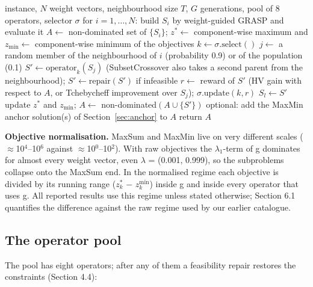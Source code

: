 \begin{algorithm}[t]
\caption{MOEA/D with a pool of operators and a selector}
\label{alg:moead}
\begin{algorithmic}
\REQUIRE instance, $N$ weight vectors, neighbourhood size $T$, $G$ generations, pool of 8 operators, selector $\sigma$
\STATE for $i=1,\dots,N$: build $S_i$ by weight-guided GRASP and evaluate it
\STATE $A \leftarrow$ non-dominated set of $\{S_i\}$; $z^{*}\leftarrow$ component-wise maximum and $z_{\min}\leftarrow$ component-wise minimum of the objectives
\STATE $k \leftarrow \sigma.\mathrm{select}()$ 
\STATE $j \leftarrow$ a random member of the neighbourhood of $i$ (probability 0.9) or of the population (0.1)
\STATE $S' \leftarrow \mathrm{operator}_k(S_j)$ (SubsetCrossover also takes a second parent from the neighbourhood); $S' \leftarrow \mathrm{repair}(S')$ if infeasible
\STATE $r \leftarrow$ reward of $S'$ (HV gain with respect to $A$, or Tchebycheff improvement over $S_j$); $\sigma.\mathrm{update}(k, r)$
\STATE $S_l \leftarrow S'$
\ENDIF
\ENDFOR
\STATE update $z^{*}$ and $z_{\min}$; $A \leftarrow$ non-dominated$(A \cup \{S'\})$
\ENDFOR
\ENDFOR
\STATE optional: add the MaxMin anchor solution(s) of Section~\ref{sec:anchor} to $A$
\STATE return $A$
\end{algorithmic}
\end{algorithm}


\textbf{Objective normalisation.} MaxSum and MaxMin live on very different scales ($\approx$10$^{4}$--10$^{6}$ against $\approx$10$^{0}$--10$^{2}$). With raw objectives the $\lambda$$_{1}$-term of g dominates for almost every weight vector, even $\lambda$ = (0.001, 0.999), so the subproblems collapse onto the MaxSum end. In the normalised regime each objective is divided by its running range ($z^{*}_k$ $-$ $z^{\min}_k$) inside g and inside every operator that uses g. All reported results use this regime unless stated otherwise; Section 6.1 quantifies the difference against the raw regime used by our earlier catalogue.

\subsection{The operator pool}\label{sec:the_operator_pool}

The pool has eight operators; after any of them a feasibility repair restores the constraints (Section 4.4):

